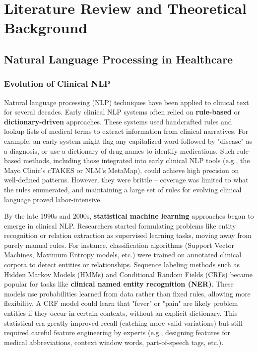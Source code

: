 
\chapter{Literature Review and Theoretical Background}
\label{chap:literature}

\section{Natural Language Processing in Healthcare}

\subsection{Evolution of Clinical NLP}

Natural language processing (NLP) techniques have been applied to clinical text for several decades. Early clinical NLP systems often relied on \textbf{rule-based} or \textbf{dictionary-driven} approaches. These systems used handcrafted rules and lookup lists of medical terms to extract information from clinical narratives. For example, an early system might flag any capitalized word followed by "disease" as a diagnosis, or use a dictionary of drug names to identify medications. Such rule-based methods, including those integrated into early clinical NLP tools (e.g., the Mayo Clinic's cTAKES or NLM's MetaMap), could achieve high precision on well-defined patterns. However, they were brittle – coverage was limited to what the rules enumerated, and maintaining a large set of rules for evolving clinical language proved labor-intensive.

By the late 1990s and 2000s, \textbf{statistical machine learning} approaches began to emerge in clinical NLP. Researchers started formulating problems like entity recognition or relation extraction as supervised learning tasks, moving away from purely manual rules. For instance, classification algorithms (Support Vector Machines, Maximum Entropy models, etc.) were trained on annotated clinical corpora to detect entities or relationships. Sequence labeling methods such as Hidden Markov Models (HMMs) and Conditional Random Fields (CRFs) became popular for tasks like \textbf{clinical named entity recognition (NER)}. These models use probabilities learned from data rather than fixed rules, allowing more flexibility. A CRF model could learn that "fever" or "pain" are likely problem entities if they occur in certain contexts, without an explicit dictionary. This statistical era greatly improved recall (catching more valid variations) but still required careful feature engineering by experts (e.g., designing features for medical abbreviations, context window words, part-of-speech tags, etc.).

